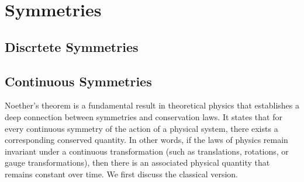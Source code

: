 \documentclass[../QFT_main.tex]{subfiles}
\begin{document}
\chapter{Symmetries}\label{ch:symmetries}





\section{Discrtete Symmetries}



\section{Continuous Symmetries}



Noether's theorem is a fundamental result in theoretical physics that establishes a deep connection between symmetries and conservation laws.
It states that for every continuous symmetry of the action of a physical system, there exists a corresponding conserved quantity. In other words, if the laws of physics remain invariant under a continuous transformation (such as translations, rotations, or gauge transformations), then there is an associated physical quantity that remains constant over time.
We first discuss the classical version.
\end{document}
